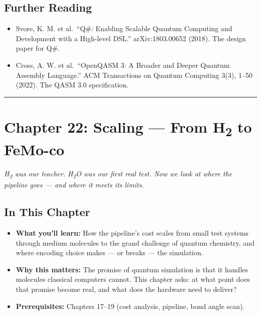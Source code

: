 \documentclass[
  11pt,
  oneside]{book}
\providecommand{\tightlist}{%
  \setlength{\itemsep}{0pt}\setlength{\parskip}{0pt}}
\begin{document}
\section{Further Reading}\label{further-reading-12}

\begin{itemize}
\tightlist
\item
  Svore, K. M. et al.~``Q\#: Enabling Scalable Quantum Computing and
  Development with a High-level DSL.'' arXiv:1803.00652 (2018). The
  design paper for Q\#.
\item
  Cross, A. W. et al.~``OpenQASM 3: A Broader and Deeper Quantum
  Assembly Language.'' ACM Transactions on Quantum Computing 3(3), 1--50
  (2022). The QASM 3.0 specification.
\end{itemize}

\begin{center}\rule{0.5\linewidth}{0.5pt}\end{center}

\chapter{Chapter 22: Scaling --- From H\textsubscript{2} to
FeMo-co}\label{chapter-22-scaling-from-hux2082-to-femo-co}

\emph{H\textsubscript{2} was our teacher. H\textsubscript{2}O was our first real test. Now we look at
where the pipeline goes --- and where it meets its limits.}

\section{In This Chapter}\label{in-this-chapter-21}

\begin{itemize}
\tightlist
\item
  \textbf{What you'll learn:} How the pipeline's cost scales from small
  test systems through medium molecules to the grand challenge of
  quantum chemistry, and where encoding choice makes --- or breaks ---
  the simulation.
\item
  \textbf{Why this matters:} The promise of quantum simulation is that
  it handles molecules classical computers cannot. This chapter asks: at
  what point does that promise become real, and what does the hardware
  need to deliver?
\item
  \textbf{Prerequisites:} Chapters 17--19 (cost analysis, pipeline, bond
  angle scan).
\end{itemize}
\end{document}
